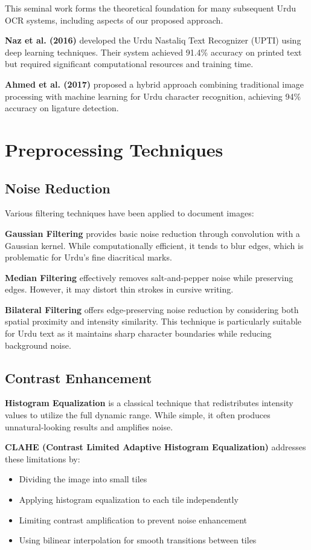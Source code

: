 \documentclass[12pt,a4paper,oneside]{report}
\begin{document}
This seminal work forms the theoretical foundation for many subsequent Urdu OCR systems, including aspects of our proposed approach.

\textbf{Naz et al. (2016)} \cite{naz2016urdu} developed the Urdu Nastaliq Text Recognizer (UPTI) using deep learning techniques. Their system achieved 91.4\% accuracy on printed text but required significant computational resources and training time.

\textbf{Ahmed et al. (2017)} \cite{ahmed2017urdu} proposed a hybrid approach combining traditional image processing with machine learning for Urdu character recognition, achieving 94\% accuracy on ligature detection.

\section{Preprocessing Techniques}

\subsection{Noise Reduction}

Various filtering techniques have been applied to document images:

\textbf{Gaussian Filtering} provides basic noise reduction through convolution with a Gaussian kernel. While computationally efficient, it tends to blur edges, which is problematic for Urdu's fine diacritical marks.

\textbf{Median Filtering} effectively removes salt-and-pepper noise while preserving edges. However, it may distort thin strokes in cursive writing.

\textbf{Bilateral Filtering} \cite{tomasi1998bilateral} offers edge-preserving noise reduction by considering both spatial proximity and intensity similarity. This technique is particularly suitable for Urdu text as it maintains sharp character boundaries while reducing background noise.

\subsection{Contrast Enhancement}

\textbf{Histogram Equalization} is a classical technique that redistributes intensity values to utilize the full dynamic range. While simple, it often produces unnatural-looking results and amplifies noise.

\textbf{CLAHE (Contrast Limited Adaptive Histogram Equalization)} \cite{zuiderveld1994contrast} addresses these limitations by:
\begin{itemize}
    \item Dividing the image into small tiles
    \item Applying histogram equalization to each tile independently
    \item Limiting contrast amplification to prevent noise enhancement
    \item Using bilinear interpolation for smooth transitions between tiles
\end{itemize}
\end{document}
